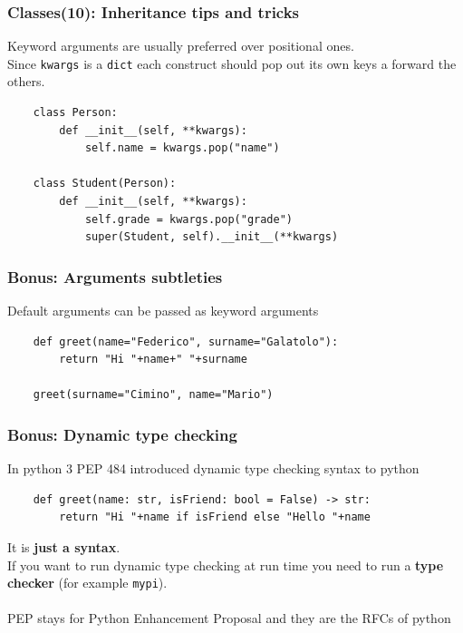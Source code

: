 \documentclass{beamer}
\begin{document}
\begin{frame}[fragile]
    \frametitle{Classes(10): Inheritance tips and tricks}
    Keyword arguments are usually preferred over positional ones.\\
    Since \texttt{kwargs} is a \texttt{dict} each construct should pop out its own keys a forward the others.\\
    \begin{verbatim}
    class Person:
        def __init__(self, **kwargs):
            self.name = kwargs.pop("name")
    
    class Student(Person):
        def __init__(self, **kwargs):
            self.grade = kwargs.pop("grade")
            super(Student, self).__init__(**kwargs)
    \end{verbatim}
\end{frame}

\begin{frame}[fragile]
    \frametitle{Bonus: Arguments subtleties}
    Default arguments can be passed as keyword arguments
    \begin{verbatim}
    def greet(name="Federico", surname="Galatolo"):
        return "Hi "+name+" "+surname

    greet(surname="Cimino", name="Mario")
    \end{verbatim}
\end{frame}

\begin{frame}[fragile]
    \frametitle{Bonus: Dynamic type checking}
    In python 3 PEP 484 introduced dynamic type checking syntax to python
    \begin{verbatim}
    def greet(name: str, isFriend: bool = False) -> str:
        return "Hi "+name if isFriend else "Hello "+name
    \end{verbatim}
    It is \textbf{just a syntax}.\\
    If you want to run dynamic type checking at run time you need to run a \textbf{type checker} (for example \texttt{mypi}).\\
    \hfill \\
    PEP stays for Python Enhancement Proposal and they are the RFCs of python
\end{frame}
\end{document}
